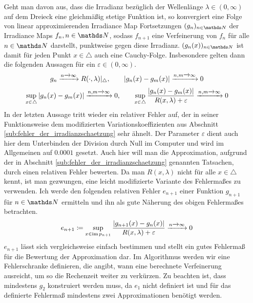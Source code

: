 		Geht man davon aus, dass die Irradianz bezüglich der Wellenlänge $\lambda\in(0,\infty)$ auf dem Dreieck eine gleichmäßig stetige Funktion ist, so konvergiert eine Folge von linear approximierenden Irradiance Map Fortsetzungen $(g_n)_{n\in\SN}$ der Irradiance Maps $f_n,n\in\SN$, sodass $f_{n+1}$ eine Verfeinerung von $f_n$ für alle $n\in\SN$ darstellt, punktweise gegen diese Irradianz.
		$(g_n(x))_{n\in\SN}$ ist damit für jeden Punkt $x\in\triangle$ auch eine Cauchy-Folge.
		Insbesondere gelten dann die folgenden Aussagen für ein $\varepsilon\in(0,\infty)$.
		\[
			g_n \xrightarrow[]{n\xrightarrow[]{}\infty} R(\cdot,\lambda)\vert_\triangle,\qquad \left\vert g_n(x) - g_m(x) \right\vert \xrightarrow[]{n,m\xrightarrow[]{}\infty} 0
		\]
		\[
			\sup_{x\in\triangle}\left\vert g_n(x) - g_m(x) \right\vert \xrightarrow[]{n,m\xrightarrow[]{}\infty} 0,\qquad
			\sup_{x\in\triangle}\frac{\left\vert g_n(x) - g_m(x) \right\vert}{R(x,\lambda) + \varepsilon} \xrightarrow[]{n,m\xrightarrow[]{}\infty} 0
		\]
		In der letzten Aussage tritt wieder ein relativer Fehler auf, der in seiner Funktionsweise dem modifizierten Variationskoeffizienten aus Abschnitt \ref{sub:fehler_der_irradianzschaetzung} sehr ähnelt.
		Der Parameter $\varepsilon$ dient auch hier dem Unterbinden der Division durch Null im Computer und wird im Allgemeinen auf $0.0001$ gesetzt.
		Auch hier will man die Approximation, aufgrund der in Abschnitt \ref{sub:fehler_der_irradianzschaetzung} genannten Tatsachen, durch einen relativen Fehler bewerten.
		Da man $R(x,\lambda)$ nicht für alle $x\in\triangle$ kennt, ist man gezwungen, eine leicht modifizierte Variante des Fehlermaßes zu verwenden.
		Ich werde den folgenden relativen Fehler $e_{n+1}$ einer Funktion $g_{n+1}$ für $n\in\SN$ ermitteln und ihn als gute Näherung des obigen Fehlermaßes betrachten.
		\[
			e_{n+1} \coloneqq \sup_{x\in\operatorname{im} p_{n+1}}\frac{\left\vert g_{n+1}(x) - g_{n}(x) \right\vert}{R(x,\lambda) + \varepsilon} \xrightarrow[]{n\xrightarrow[]{}\infty} 0
		\]
		$e_{n+1}$ lässt sich vergleichsweise einfach bestimmen und stellt ein gutes Fehlermaß für die Bewertung der Approximation dar.
		Im Algorithmus werden wir eine Fehlerschranke definieren, die angibt, wann eine berechnete Verfeinerung ausreicht, um so die Rechenzeit weiter zu verkürzen.
		Zu beachten ist, dass mindestens $g_2$ konstruiert werden muss, da $e_1$ nicht definiert ist und für das definierte Fehlermaß mindestens zwei Approximationen benötigt werden.

